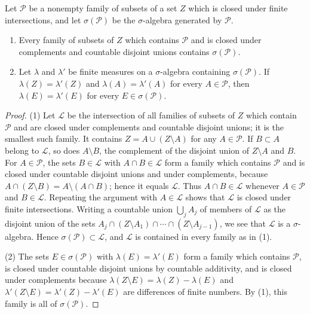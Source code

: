 \begin{lemma}\label{lem:pi-lambda}
Let $\mathcal P$ be a nonempty family of subsets of a set $Z$ which is closed under finite intersections, and let $\sigma(\mathcal P)$ be the $\sigma$-algebra generated by $\mathcal P$.
\begin{enumerate}
\item Every family of subsets of $Z$ which contains $\mathcal P$ and is closed under complements and countable disjoint unions contains $\sigma(\mathcal P)$.
\item Let $\lambda$ and $\lambda'$ be finite measures on a $\sigma$-algebra containing $\sigma(\mathcal P)$. If $\lambda(Z)=\lambda'(Z)$ and $\lambda(A)=\lambda'(A)$ for every $A\in\mathcal P$, then $\lambda(E)=\lambda'(E)$ for every $E\in\sigma(\mathcal P)$.
\end{enumerate}
\end{lemma}
\begin{proof}
(1) Let $\mathcal L$ be the intersection of all families of subsets of $Z$ which contain $\mathcal P$ and are closed under complements and countable disjoint unions; it is the smallest such family. It contains $Z=A\cup(Z\setminus A)$ for any $A\in\mathcal P$. If $B\subset A$ belong to $\mathcal L$, so does $A\setminus B$, the complement of the disjoint union of $Z\setminus A$ and $B$. For $A\in\mathcal P$, the sets $B\in\mathcal L$ with $A\cap B\in\mathcal L$ form a family which contains $\mathcal P$ and is closed under countable disjoint unions and under complements, because $A\cap(Z\setminus B)=A\setminus(A\cap B)$; hence it equals $\mathcal L$. Thus $A\cap B\in\mathcal L$ whenever $A\in\mathcal P$ and $B\in\mathcal L$. Repeating the argument with $A\in\mathcal L$ shows that $\mathcal L$ is closed under finite intersections. Writing a countable union $\bigcup_jA_j$ of members of $\mathcal L$ as the disjoint union of the sets $A_j\cap(Z\setminus A_1)\cap\cdots\cap(Z\setminus A_{j-1})$, we see that $\mathcal L$ is a $\sigma$-algebra. Hence $\sigma(\mathcal P)\subset\mathcal L$, and $\mathcal L$ is contained in every family as in (1).

(2) The sets $E\in\sigma(\mathcal P)$ with $\lambda(E)=\lambda'(E)$ form a family which contains $\mathcal P$, is closed under countable disjoint unions by countable additivity, and is closed under complements because $\lambda(Z\setminus E)=\lambda(Z)-\lambda(E)$ and $\lambda'(Z\setminus E)=\lambda'(Z)-\lambda'(E)$ are differences of finite numbers. By (1), this family is all of $\sigma(\mathcal P)$.
\end{proof}

